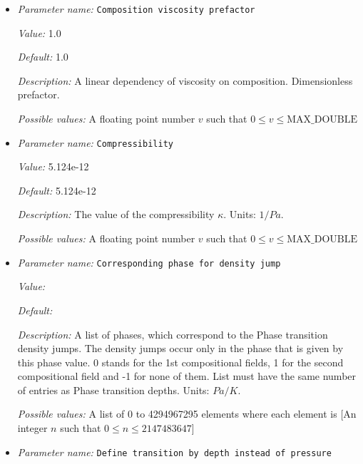 \begin{itemize}
\item {\it Parameter name:} {\tt Composition viscosity prefactor}
\label{parameters:Material model/Latent heat/Composition viscosity prefactor}
\label{parameters:Material_20model/Latent_20heat/Composition_20viscosity_20prefactor}


{\it Value:} 1.0


{\it Default:} 1.0


{\it Description:} A linear dependency of viscosity on composition. Dimensionless prefactor.


{\it Possible values:} A floating point number $v$ such that $0 \leq v \leq \text{MAX\_DOUBLE}$
\item {\it Parameter name:} {\tt Compressibility}
\label{parameters:Material model/Latent heat/Compressibility}
\label{parameters:Material_20model/Latent_20heat/Compressibility}


{\it Value:} 5.124e-12


{\it Default:} 5.124e-12


{\it Description:} The value of the compressibility $\kappa$. Units: $1/Pa$.


{\it Possible values:} A floating point number $v$ such that $0 \leq v \leq \text{MAX\_DOUBLE}$
\item {\it Parameter name:} {\tt Corresponding phase for density jump}
\label{parameters:Material model/Latent heat/Corresponding phase for density jump}
\label{parameters:Material_20model/Latent_20heat/Corresponding_20phase_20for_20density_20jump}


{\it Value:} 


{\it Default:} 


{\it Description:} A list of phases, which correspond to the Phase transition density jumps. The density jumps occur only in the phase that is given by this phase value. 0 stands for the 1st compositional fields, 1 for the second compositional field and -1 for none of them. List must have the same number of entries as Phase transition depths. Units: $Pa/K$.


{\it Possible values:} A list of 0 to 4294967295 elements where each element is [An integer $n$ such that $0\leq n \leq 2147483647$]
\item {\it Parameter name:} {\tt Define transition by depth instead of pressure}
\label{parameters:Material model/Latent heat/Define transition by depth instead of pressure}
\label{parameters:Material_20model/Latent_20heat/Define_20transition_20by_20depth_20instead_20of_20pressure}



\end{itemize}
